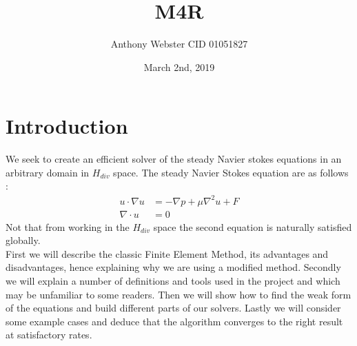 \documentclass[11pt,twoside,a4paper]{article}
\begin{document}
\setcounter{secnumdepth}{0}
\title{M4R}
\date{March 2nd, 2019}
\author{Anthony Webster CID 01051827}
\maketitle
\section{Introduction}
We seek to create an efficient solver of the steady Navier stokes equations in an arbitrary domain in $H_{div}$ space. The steady Navier Stokes equation are as follows : 
\begin{align}
u \cdot \nabla u &= -\nabla p + \mu \nabla^2 u + F \\
\nabla \cdot u &= 0
\end{align}
Not that from working in the $H_{div}$ space the second equation is naturally satisfied globally.
\\
First we will describe the classic Finite Element Method, its advantages and disadvantages, hence explaining why we are using a modified method. Secondly we will explain a number of definitions and tools used in the project and which may be unfamiliar to some readers. Then we will show how to find the weak form of the equations and build different parts of our solvers. Lastly we will consider some example cases and deduce that the algorithm converges to the right result at satisfactory rates.\\
\end{document}
